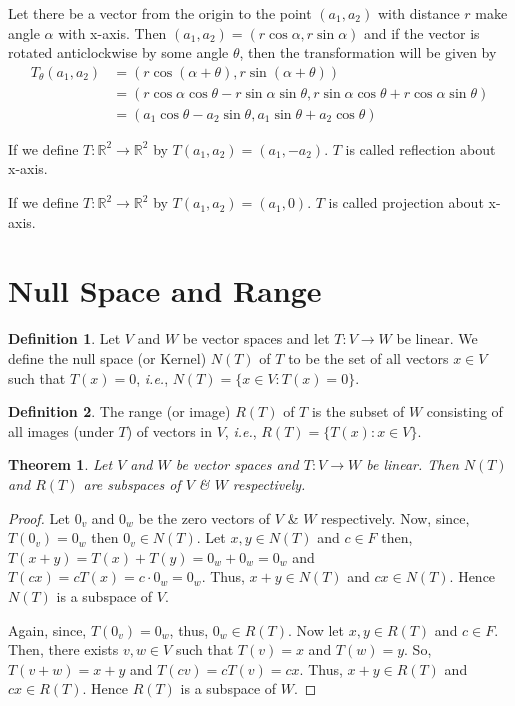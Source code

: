 \documentclass[12pt, a4paper]{article}
\newtheorem{theorem}{Theorem}[section]
\theoremstyle{definition}
\newtheorem{definition}{Definition}[section]
\theoremstyle{remark}
\begin{document}
Let there be a vector from the origin to the point $(a_1,a_2)$ with distance $r$ make angle $\alpha$ with x-axis. Then $(a_1,a_2) = (r\cos\alpha,r\sin\alpha)$ and if the vector is rotated anticlockwise by some angle $\theta$, then the transformation will be given by
\begin{align*}
    T_\theta(a_1,a_2) &= (r\cos(\alpha + \theta), r\sin(\alpha + \theta)) \\
    &= (r\cos\alpha\cos\theta - r\sin\alpha\sin\theta, r\sin\alpha\cos\theta + r\cos\alpha\sin\theta) \\
    &= (a_1\cos\theta-a_2\sin\theta, a_1\sin\theta+a_2\cos\theta)
\end{align*}

If we define $T:\mathbb{R}^2 \to \mathbb{R}^2$ by $T(a_1,a_2)=(a_1,-a_2)$. $T$ is called reflection about x-axis.

If we define $T:\mathbb{R}^2 \to \mathbb{R}^2$ by $T(a_1,a_2)=(a_1,0)$. $T$ is called projection about x-axis.

\section{Null Space and Range}
\begin{definition}
    Let $V$ and $W$ be vector spaces and let $T:V \to W$ be linear. We define the null space (or Kernel) $N(T)$ of $T$ to be the set of all vectors $x \in V$ such that $T(x)=0$, \textit{i.e.}, $N(T) = \{x \in V : T(x)=0\}$.
\end{definition}

\begin{definition}
    The range (or image) $R(T)$ of $T$ is the subset of $W$ consisting of all images (under $T$) of vectors in $V$, \textit{i.e.}, $R(T) = \{T(x) : x \in V\}$.
\end{definition}

\begin{theorem}
    Let $V$ and $W$ be vector spaces and $T: V \to W$ be linear. Then $N(T)$ and $R(T)$ are subspaces of $V$ \& $W$ respectively.
\end{theorem}

\begin{proof}
    Let $0_v$ and $0_w$ be the zero vectors of $V$ \& $W$ respectively. Now, since, $T(0_v) = 0_w$ then $0_v \in N(T)$. Let $x, y \in N(T)$ and $c \in F$ then, $T(x+y) = T(x) + T(y) = 0_w + 0_w = 0_w$ and $T(cx) = c T(x) = c \cdot 0_w = 0_w$. Thus, $x+y \in N(T)$ and $cx \in N(T)$. Hence $N(T)$ is a subspace of $V$.

    Again, since, $T(0_v) = 0_w$, thus, $0_w \in R(T)$. Now let $x, y \in R(T)$ and $c \in F$. Then, there exists $v, w \in V$ such that $T(v) = x$ and $T(w) = y$. So, $T(v+w) = x+y$ and $T(cv) = c T(v) = cx$. Thus, $x+y \in R(T)$ and $cx \in R(T)$. Hence $R(T)$ is a subspace of $W$.
\end{proof}
\end{document}
